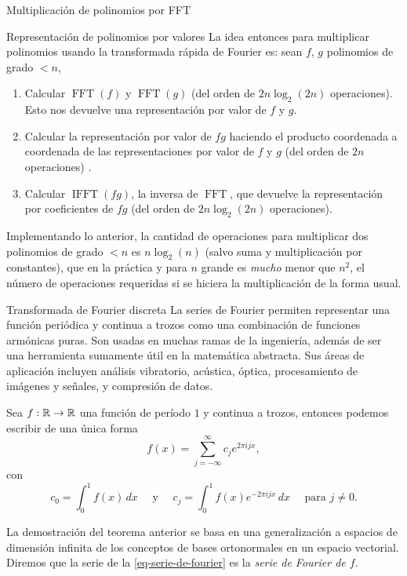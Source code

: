 \begin{chapter}{Multiplicación de polinomios por FFT}
\begin{section}{Representación de polinomios por valores}
    La idea entonces para multiplicar polinomios usando la transformada rápida de Fourier es:  sean $f$, $g$ polinomios de grado $<n$,
    \begin{enumerate}
        \item Calcular $\operatorname{FFT}(f)$ y $\operatorname{FFT}(g)$ (del orden de $2n\operatorname{log}_2(2n)$ operaciones). Esto nos devuelve una representación por valor de $f$ y $g$.
        \item Calcular  la representación por valor de $fg$ haciendo el producto coordenada a coordenada de las representaciones por valor de $f$ y $g$ (del orden de $2n$ operaciones)  .
        \item Calcular $\operatorname{IFFT}(fg)$, la inversa de $\operatorname{FFT}$, que devuelve la representación por coeficientes de $fg$ (del orden de $2n\operatorname{log}_2(2n)$ operaciones).
    \end{enumerate}

    Implementando lo anterior, la cantidad de operaciones para multiplicar dos polinomios de grado $<n$  es $n \log_2(n)$ (salvo suma y multiplicación por constantes), que en la práctica y para $n$ grande es \textit{mucho} menor que $n^2$, el número de operaciones requeridas si se hiciera la multiplicación de la forma usual.

 \end{section}

 \begin{section}{Transformada de Fourier discreta} La series de Fourier permiten representar una función periódica y continua a trozos como una combinación de funciones armónicas puras. Son usadas en muchas ramas de la ingeniería, además de ser una herramienta sumamente útil en la matemática abstracta. Sus áreas de aplicación incluyen análisis vibratorio, acústica, óptica, procesamiento de imágenes y señales, y compresión de datos.

    \begin{teorema}\label{th-series-de-fourier}
        Sea $f: \mathbb R \to \mathbb R$ una función de período $1$ y continua a trozos, entonces podemos escribir de una única forma
        \begin{equation}\label{eq-serie-de-fourier}
            f(x) = \sum_{ j= -\infty}^\infty c_j e^{2\pi ijx},
        \end{equation}
        con
        $$
        c_0 = \int_0^1 f(x) \, dx \quad \text{ y } \quad c_j = \int_0^1 f(x) e^{-2\pi ijx} \, dx \quad \text{ para } j \ne 0.
        $$ 
    \end{teorema}
    La demostración del teorema anterior se basa en una generalización a espacios de dimensión infinita de los conceptos de bases ortonormales en un espacio vectorial. Diremos que la serie de la \eqref{eq-serie-de-fourier} es la \textit{serie de Fourier de $f$}.


\end{section}
\end{chapter}
